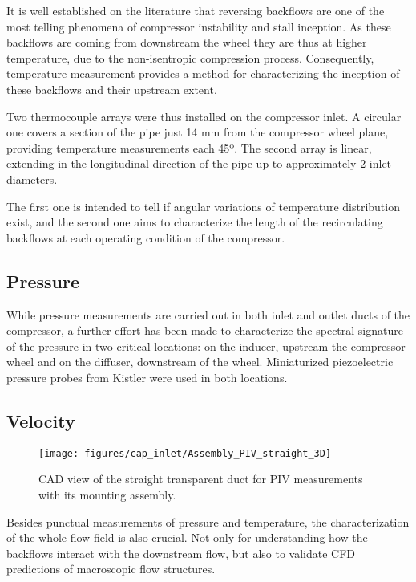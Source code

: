 It is well established on the literature that reversing backflows are one of the most telling phenomena of compressor instability and stall inception. As these backflows are coming from downstream the wheel they are thus at higher temperature, due to the non-isentropic compression process. Consequently, temperature measurement provides a method for characterizing the inception of these backflows and their upstream extent.

Two thermocouple arrays were thus installed on the compressor inlet. A circular one covers a section of the pipe just 14 mm from the compressor wheel plane, providing temperature measurements each 45º. The second array is linear, extending in the longitudinal direction of the pipe up to approximately 2 inlet diameters.

The first one is intended to tell if angular variations of temperature distribution exist, and the second one aims to characterize the length of the recirculating backflows at each operating condition of the compressor.

\subsection{Pressure}

While pressure measurements are carried out in both inlet and outlet ducts of the compressor, a further effort has been made to characterize the spectral signature of the pressure in two critical locations: on the inducer, upstream the compressor wheel and on the diffuser, downstream of the wheel. Miniaturized piezoelectric pressure probes from Kistler were used in both locations.

\subsection{Velocity}

\begin{figure}[b!]
\centering
\texttt{[image: figures/cap\_inlet/Assembly\_PIV\_straight\_3D]}
\caption{CAD view of the straight transparent duct for PIV measurements with its mounting assembly.}
\label{fig:metod_local_meas_dimen}
\end{figure}

Besides punctual measurements of pressure and temperature, the characterization of the whole flow field is also crucial. Not only for understanding how the backflows interact with the downstream flow, but also to validate CFD predictions of macroscopic flow structures.

